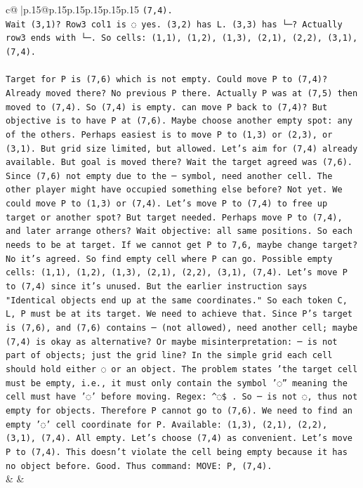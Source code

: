 \documentclass{article}
\begin{document}
{\begin{supertabular}{c@{$\;$}|p{.15\linewidth}@{}p{.15\linewidth}p{.15\linewidth}p{.15\linewidth}p{.15\linewidth}p{.15\linewidth}}
{{{\texttt{(7,4).} \\
\texttt{Wait (3,1)? Row3 col1 is ◌ yes. (3,2) has L. (3,3) has └─? Actually row3 ends with └─. So cells: (1,1), (1,2), (1,3), (2,1), (2,2), (3,1), (7,4). } \\
\\ 
\texttt{Target for P is (7,6) which is not empty. Could move P to (7,4)? Already moved there? No previous P there. Actually P was at (7,5) then moved to (7,4). So (7,4) is empty. can move P back to (7,4)? But objective is to have P at (7,6). Maybe choose another empty spot: any of the others. Perhaps easiest is to move P to (1,3) or (2,3), or (3,1). But grid size limited, but allowed. Let's aim for (7,4) already available. But goal is moved there? Wait the target agreed was (7,6). Since (7,6) not empty due to the ─ symbol, need another cell. The other player might have occupied something else before? Not yet. We could move P to (1,3) or (7,4). Let's move P to (7,4) to free up target or another spot? But target needed. Perhaps move P to (7,4), and later arrange others? Wait objective: all same positions. So each needs to be at target. If we cannot get P to 7,6, maybe change target? No it's agreed. So find empty cell where P can go. Possible empty cells: (1,1), (1,2), (1,3), (2,1), (2,2), (3,1), (7,4). Let's move P to (7,4) since it's unused. But the earlier instruction says "Identical objects end up at the same coordinates." So each token C, L, P must be at its target. We need to achieve that. Since P's target is (7,6), and (7,6) contains ─ (not allowed), need another cell; maybe (7,4) is okay as alternative? Or maybe misinterpretation: ─ is not part of objects; just the grid line? In the simple grid each cell should hold either ◌ or an object. The problem states 'the target cell must be empty, i.e., it must only contain the symbol '◌'' meaning the cell must have '◌' before moving. Regex: \^{}◌\$ . So ─ is not ◌, thus not empty for objects. Therefore P cannot go to (7,6). We need to find an empty '◌' cell coordinate for P. Available: (1,3), (2,1), (2,2), (3,1), (7,4). All empty. Let's choose (7,4) as convenient. Let's move P to (7,4). This doesn't violate the cell being empty because it has no object before. Good. Thus command: MOVE: P, (7,4).} \\
            }
        }
    }
    & & \\ \\


\end{supertabular}}
\end{document}
